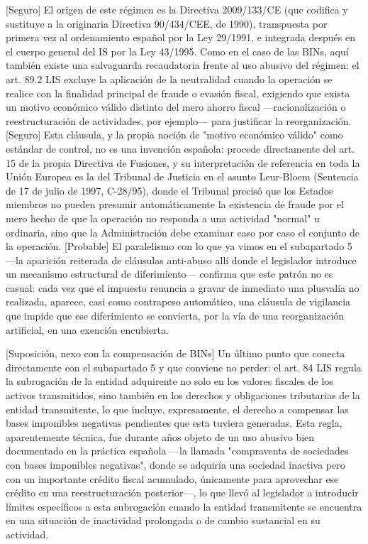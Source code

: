 \documentclass[10pt,a4paper]{article}
\begin{document}
[Seguro] El origen de este régimen es la Directiva 2009/133/CE (que codifica y sustituye a la originaria Directiva 90/434/CEE, de 1990), transpuesta por primera vez al ordenamiento español por la Ley 29/1991, e integrada después en el cuerpo general del IS por la Ley 43/1995. Como en el caso de las BINs, aquí también existe una salvaguarda recaudatoria frente al uso abusivo del régimen: el art. 89.2 LIS excluye la aplicación de la neutralidad cuando la operación se realice con la finalidad principal de fraude o evasión fiscal, exigiendo que exista un motivo económico válido distinto del mero ahorro fiscal —racionalización o reestructuración de actividades, por ejemplo— para justificar la reorganización. [Seguro] Esta cláusula, y la propia noción de "motivo económico válido" como estándar de control, no es una invención española: procede directamente del art. 15 de la propia Directiva de Fusiones, y su interpretación de referencia en toda la Unión Europea es la del Tribunal de Justicia en el asunto Leur-Bloem (Sentencia de 17 de julio de 1997, C-28/95), donde el Tribunal precisó que los Estados miembros no pueden presumir automáticamente la existencia de fraude por el mero hecho de que la operación no responda a una actividad "normal" u ordinaria, sino que la Administración debe examinar caso por caso el conjunto de la operación. [Probable] El paralelismo con lo que ya vimos en el subapartado 5 —la aparición reiterada de cláusulas anti-abuso allí donde el legislador introduce un mecanismo estructural de diferimiento— confirma que este patrón no es casual: cada vez que el impuesto renuncia a gravar de inmediato una plusvalía no realizada, aparece, casi como contrapeso automático, una cláusula de vigilancia que impide que ese diferimiento se convierta, por la vía de una reorganización artificial, en una exención encubierta.

[Suposición, nexo con la compensación de BINs] Un último punto que conecta directamente con el subapartado 5 y que conviene no perder: el art. 84 LIS regula la subrogación de la entidad adquirente no solo en los valores fiscales de los activos transmitidos, sino también en los derechos y obligaciones tributarias de la entidad transmitente, lo que incluye, expresamente, el derecho a compensar las bases imponibles negativas pendientes que esta tuviera generadas. Esta regla, aparentemente técnica, fue durante años objeto de un uso abusivo bien documentado en la práctica española —la llamada "compraventa de sociedades con bases imponibles negativas", donde se adquiría una sociedad inactiva pero con un importante crédito fiscal acumulado, únicamente para aprovechar ese crédito en una reestructuración posterior—, lo que llevó al legislador a introducir límites específicos a esta subrogación cuando la entidad transmitente se encuentra en una situación de inactividad prolongada o de cambio sustancial en su actividad.
\end{document}
